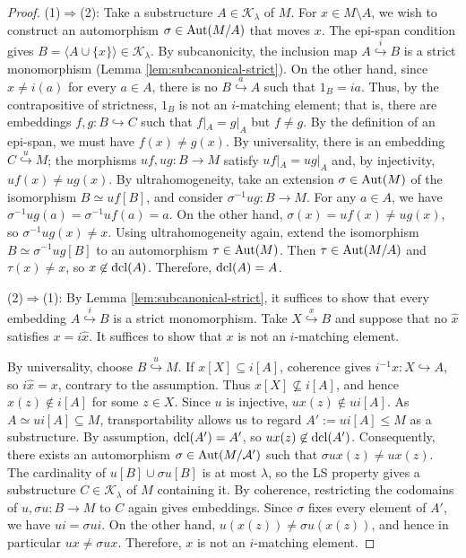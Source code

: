 \documentclass[10pt]{amsart}
\numberwithin{equation}{section}
\theoremstyle{plain}
\theoremstyle{definition}
\newcommand{\A}{\mathcal{A}}
\newcommand{\K}{\mathcal{K}}
\newcommand{\pair}[1]{\langle #1 \rangle}
\newcommand{\embed}{\hookrightarrow}
\newcommand{\embedge}[1]{\overset{#1}{\embed}}
\begin{document}
\begin{proof}
(1)$\Rightarrow$(2):
Take a substructure $A\in\K_\lambda$ of $M$.
For $x\in M\setminus A$, we wish to construct an automorphism $\sigma\in{\rm Aut}(M/A)$ that moves $x$.
The epi-span condition gives $B=\pair{A\cup\{x\}}\in\K_\lambda$.
By subcanonicity, the inclusion map $A\embedge{i} B$ is a strict monomorphism (Lemma \ref{lem:subcanonical-strict}).
On the other hand, since $x\not=i(a)$ for every $a\in A$, there is no $B\embedge{a}A$ such that $1_B=ia$.
Thus, by the contrapositive of strictness, $1_B$ is not an $i$-matching element; that is, there are embeddings $f,g\colon B\embed C$ such that $f|_A=g|_A$ but $f\not=g$.
By the definition of an epi-span, we must have $f(x)\not=g(x)$.
By universality, there is an embedding $C\embedge{u} M$; the morphisms $uf,ug\colon B\to M$ satisfy $uf|_A=ug|_A$ and, by injectivity, $uf(x)\not=ug(x)$.
By ultrahomogeneity, take an extension $\sigma\in{\rm Aut}(M)$ of the isomorphism $B\simeq uf[B]$, and consider $\sigma^{-1}ug\colon B\to M$.
For any $a\in A$, we have $\sigma^{-1}ug(a)=\sigma^{-1}uf(a)=a$.
On the other hand, $\sigma(x)=uf(x)\not=ug(x)$, so $\sigma^{-1}ug(x)\not=x$.
Using ultrahomogeneity again, extend the isomorphism $B\simeq\sigma^{-1} ug[B]$ to an automorphism $\tau\in{\rm Aut}(M)$.
Then $\tau\in{\rm Aut}(M/A)$ and $\tau(x)\not=x$, so $x\not\in{\rm dcl}(A)$.
Therefore, ${\rm dcl}(A)=A$.

(2)$\Rightarrow$(1):
By Lemma \ref{lem:subcanonical-strict}, it suffices to show that every embedding $A\embedge{i}B$ is a strict monomorphism.
Take $X\embedge{x}B$ and suppose that no $\hat{x}$ satisfies $x=i\hat{x}$.
It suffices to show that $x$ is not an $i$-matching element.

By universality, choose $B\embedge{u}M$.
If $x[X]\subseteq i[A]$, coherence gives $i^{-1}x\colon X\embed A$, so $i\hat{x}=x$, contrary to the assumption.
Thus $x[X]\not\subseteq i[A]$, and hence $x(z)\not\in i[A]$ for some $z\in X$.
Since $u$ is injective, $ux(z)\not\in ui[A]$.
As $A\simeq ui[A]\subseteq M$, transportability allows us to regard $A':=ui[A]\leq M$ as a substructure.
By assumption, ${\rm dcl}(A')=A'$, so $ux(z)\not\in{\rm dcl}(A')$.
Consequently, there exists an automorphism $\sigma\in{\rm Aut}(M/\A')$ such that $\sigma ux(z)\not=ux(z)$.
The cardinality of $u[B]\cup\sigma u[B]$ is at most $\lambda$, so the LS property gives a substructure $C\in\K_\lambda$ of $M$ containing it.
By coherence, restricting the codomains of $u,\sigma u\colon B\to M$ to $C$ again gives embeddings.
Since $\sigma$ fixes every element of $A'$, we have $u i=\sigma ui$.
On the other hand, $u(x(z))\not=\sigma u(x(z))$, and hence in particular $ux\not=\sigma ux$.
Therefore, $x$ is not an $i$-matching element.
\end{proof}
\end{document}
